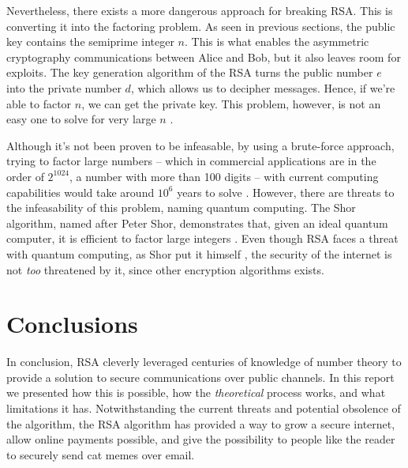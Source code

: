 \documentclass[11pt]{scrartcl}
\begin{document}
Nevertheless, there exists a more dangerous approach for breaking RSA. This is converting it
into the factoring problem. As seen in previous sections, the public key contains the
semiprime integer $n$. This is what enables the asymmetric cryptography communications
between Alice and Bob, but it also leaves room for exploits. The key generation algorithm
of the RSA turns the public number $e$ into the private number $d$, which allows us to
decipher messages. Hence, if we're able to factor $n$, we can get the private key. This
problem, however, is not an easy one to solve for very large $n$ \cite{factorization}
\cite{tale2009}. 

Although it's not been proven to be infeasable, by using a brute-force approach,
trying to factor large numbers -- which in commercial applications are in the order of
$2^{1024}$, a number with more than 100 digits -- with current computing capabilities
would take around $10^6$ years to solve \cite{factorization} \cite{tale2009}. However,
there are threats to the infeasability of this problem, naming quantum computing. The Shor
algorithm, named after Peter Shor, demonstrates that, given an ideal quantum computer, it
is efficient to factor large integers \cite{shorAlgorithm}. Even though RSA faces a threat with quantum
computing, as Shor put it himself \cite{shor2020}, the security of the internet is not \emph{too}
threatened by it, since other encryption algorithms exists.

\section{Conclusions}
In conclusion, RSA cleverly leveraged centuries of knowledge of number theory to provide a
solution to secure communications over public channels. In this report we presented how
this is possible, how the \emph{theoretical} process works, and what limitations it has.
Notwithstanding the current threats and potential obsolence of the algorithm, the RSA
algorithm has provided a way to grow a secure internet, allow online payments possible,
and give the possibility to people like the reader to securely send cat memes over email.

\newpage

\printbibliography
\end{document}
